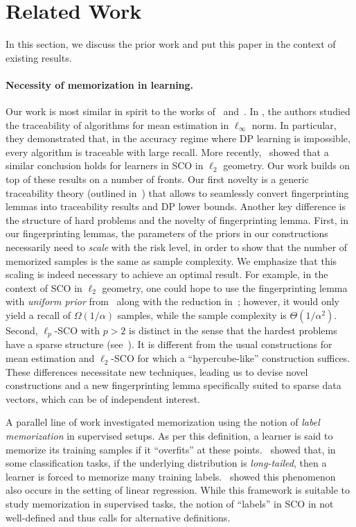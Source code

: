 \section{Related Work}
In this section, we discuss the prior work and put this paper in the context of existing results. 

\paragraph{Necessity of memorization in learning.} 
Our work is most similar in spirit to the works of~\citet{dwork2015robust} and~\citet{attias2024information}. In \cite{dwork2015robust}, the authors studied the traceability of algorithms for mean estimation in $\ell_\infty$ norm. In particular, they demonstrated that, in the accuracy regime where DP learning is impossible, every algorithm is traceable with large recall. 
More recently,~\cite{attias2024information} showed that a similar conclusion holds for learners in SCO in $\ell_2$ geometry. Our work builds on top of these results on a number of fronts. Our first novelty is a generic traceability theory (outlined in~) that allows to seamlessly convert fingerprinting lemmas into traceability results and DP lower bounds. 
Another key difference is the structure of hard problems and the novelty of fingerprinting lemma. First, in our fingerprinting lemmas, the parameters of the priors in our constructions necessarily need to \emph{scale} with the risk level, in order to show that the number of memorized samples is the same as sample complexity. 
We emphasize that this scaling is indeed necessary to achieve an optimal result. For example, in the context of SCO in $\ell_2$ geometry, one could hope to use the fingerprinting lemma with \emph{uniform prior} from~\cite{dwork2015robust} along with the reduction in~\cite[Sec.~5.1]{bassily2014private}; however, it would only yield a recall of $\Omega(1/\alpha)$ samples, while the sample complexity is $\Theta(1/\alpha^2)$.  Second, $\ell_p$-SCO with $p > 2$ is distinct in the sense that the hardest problems have a sparse structure (see~\cite{agarwal2009information}). It is different from the usual constructions for mean estimation and $\ell_2$-SCO for which a ``hypercube-like'' construction suffices.  These differences necessitate new techniques, leading us to devise novel constructions and a new fingerprinting lemma specifically suited to sparse data vectors, which can be of independent interest.

A parallel line of work investigated memorization using the notion of \emph{label memorization} in supervised setups.
As per this definition, a learner is said to memorize its training samples if it ``overfits'' at these points.~\citet{feldman2020does} showed that, in some classification tasks, if the underlying distribution is \emph{long-tailed}, then a learner is forced to memorize many training labels.~\citet{cheng2022memorize} showed this phenomenon also occurs in the setting of linear regression. While this framework is suitable to study memorization in supervised tasks, the notion of ``labels'' in SCO in not well-defined and thus calls for alternative definitions.


